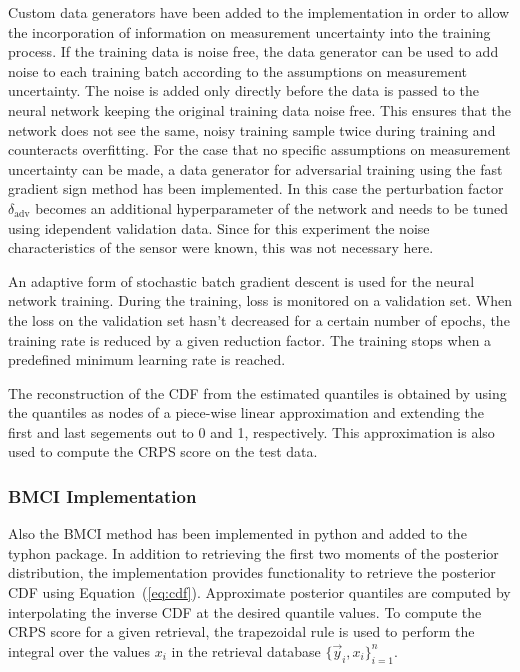 \documentclass[journal abbreviation, manuscript]{copernicus}
\begin{document}
  Custom data generators have been added to the implementation in order to allow
  the incorporation of information on measurement uncertainty into the training
  process. If the training data is noise free, the data generator can be used to
  add noise to each training batch according to the assumptions on measurement
  uncertainty. The noise is added only directly before the data is passed to the
  neural network keeping the original training data noise free. This ensures
  that the network does not see the same, noisy training sample twice during
  training and counteracts overfitting. For the case that no specific assumptions
  on measurement uncertainty can be made, a data generator for adversarial
  training using the fast gradient sign method has been implemented. In this
  case the perturbation factor $\delta_{\text{adv}}$ becomes an additional
  hyperparameter of the network and needs to be tuned using idependent
  validation data. Since for this experiment the noise characteristics of the
  sensor were known, this was not necessary here.

  An adaptive form of stochastic batch gradient descent is used for the neural
  network training. During the training, loss is monitored on a validation set.
  When the loss on the validation set hasn't decreased for a certain number of
  epochs, the training rate is reduced by a given reduction factor. The training
  stops when a predefined minimum learning rate is reached.

  The reconstruction of the CDF from the estimated quantiles is obtained
  by using the quantiles as nodes of a piece-wise linear approximation and
  extending the first and last segements out to 0 and 1, respectively.
  This approximation is also used to compute the CRPS score on the test
  data.


\subsubsection{BMCI Implementation}
\label{sec:implementation_bmci}

 Also the BMCI method has been implemented in python and added to the
 typhon package. In addition to retrieving the first two moments of the
 posterior distribution, the implementation provides functionality to
 retrieve the posterior CDF using Equation~(\ref{eq:cdf}). Approximate posterior
 quantiles are computed by interpolating the inverse CDF at the desired quantile
 values. To compute the CRPS score for a given retrieval, the trapezoidal rule
 is used to perform the integral over the values $x_i$ in the retrieval database
 $\{\vec{y}_i, x_i\}_{i = 1}^n$.
\end{document}
